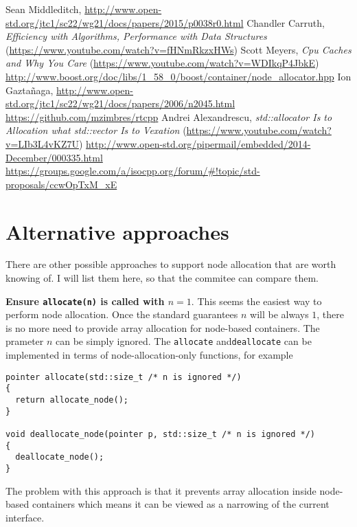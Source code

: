 \documentclass[11pt]{article}
\begin{document}
\begin{thebibliography}{9}

   Sean Middleditch, \url{http://www.open-std.org/jtc1/sc22/wg21/docs/papers/2015/p0038r0.html}
   Chandler Carruth, {\it Efficiency with Algorithms, Performance
  with Data Structures} (\url{https://www.youtube.com/watch?v=fHNmRkzxHWs})
   Scott Meyers, {\it Cpu Caches and Why You Care} (\url{https://www.youtube.com/watch?v=WDIkqP4JbkE})
   \url{http://www.boost.org/doc/libs/1_58_0/boost/container/node_allocator.hpp}
   Ion Gazta\~ naga, \url{http://www.open-std.org/jtc1/sc22/wg21/docs/papers/2006/n2045.html}
   \url{https://github.com/mzimbres/rtcpp}
   Andrei Alexandrescu, {\it std::allocator Is to Allocation what
  std::vector Is to Vexation} (\url{https://www.youtube.com/watch?v=LIb3L4vKZ7U})
   \url{http://www.open-std.org/pipermail/embedded/2014-December/000335.html}
   \url{https://groups.google.com/a/isocpp.org/forum/#!topic/std-proposals/ccwOpTxM_xE}

\end{thebibliography}

\appendix

\section{Alternative approaches} \label{alternative}

There are other possible approaches to support node allocation that are worth knowing
of.  I will list them here, so that the commitee can compare them.

\medskip
\noindent
{\bf Ensure \texttt{allocate(n)} is called with $n = 1$}. This seems the easiest
way to perform node allocation. Once the standard guarantees $n$ will be always $1$,
there is no more need to provide array allocation for node-based containers. The
prameter $n$ can be simply ignored. The \texttt{allocate} and\texttt{deallocate}
can be implemented in terms of node-allocation-only functions, for example
\medskip
\begin{lstlisting}
pointer allocate(std::size_t /* n is ignored */)
{
  return allocate_node();
}

void deallocate_node(pointer p, std::size_t /* n is ignored */)
{
  deallocate_node();
}
\end{lstlisting}

The problem with this approach is that it prevents array allocation inside
node-based containers which means it can be viewed as a narrowing of the
current interface.
\end{document}
